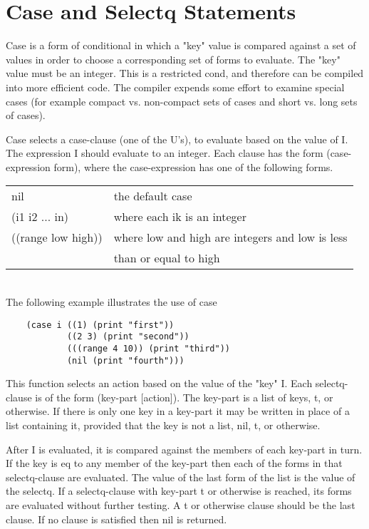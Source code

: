 \section{Case and Selectq Statements}

  Case  is  a  form  of  conditional  in  which a "key" value is
compared  against  a  set  of  values  in  order  to  choose   a
corresponding set of forms to evaluate.  The "key" value must be
an  integer.    This  is a restricted cond, and therefore can be
compiled into more efficient code.  The  compiler  expends  some
effort  to  examine  special  cases  (for  example  compact  vs.
non-compact sets of cases and short vs. long sets of cases).


{    Case selects a case-clause (one of the U's),    to  evaluate
    based  on  the value of I.  The expression I should evaluate
    to an integer.  Each clause has  the  form  (case-expression
    form),  where  the  case-expression has one of the following
    forms.}

\begin{tabular}{ll}
    nil & the default case\\

    (i1 i2 ... in) & where each ik is an integer\\

    ((range low high)) & where low and high are integers and low
                  is less \\
														& than or equal to high\\
\end{tabular}\\


The following example illustrates the use of case

\begin{verbatim}
    (case i ((1) (print "first"))
            ((2 3) (print "second"))
            (((range 4 10)) (print "third"))
            (nil (print "fourth")))
\end{verbatim}

{    This  function  selects  an action based on the value of the
    "key" I.  Each  selectq-clause  is  of  the  form  (key-part
    [action]).  The key-part is a list of keys, t, or otherwise.
    If  there is only one key in a key-part it may be written in
    place of a list containing it, provided that the key is  not
    a list, nil, t, or otherwise.

    After  I is evaluated, it is compared against the members of
    each key-part in turn.  If the key is eq to  any  member  of
    the  key-part  then each of the forms in that selectq-clause
    are evaluated.  The value of the last form of  the  list  is
    the value of the selectq.  If a selectq-clause with key-part
    t  or  otherwise is reached, its forms are evaluated without
    further testing.  A t or otherwise clause should be the last
    clause.  If no clause is satisfied then nil is returned.
}

